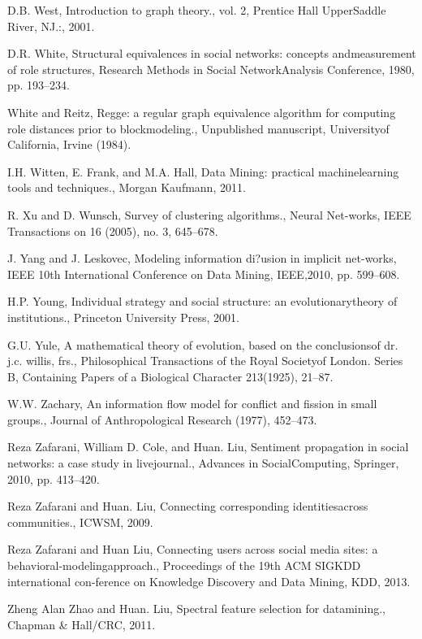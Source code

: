 \begin{thebibliography}{999}
 D.B. West, Introduction to graph theory., vol. 2, Prentice Hall UpperSaddle River, NJ.:, 2001.

 D.R. White, Structural equivalences in social networks: concepts andmeasurement of role structures, Research Methods in Social NetworkAnalysis Conference, 1980, pp. 193–234.

 White and Reitz, Regge: a regular graph equivalence algorithm for computing role distances prior to blockmodeling., Unpublished manuscript, Universityof California, Irvine (1984).

 I.H. Witten, E. Frank, and M.A. Hall, Data Mining: practical machinelearning tools and techniques., Morgan Kaufmann, 2011.

 R. Xu and D. Wunsch, Survey of clustering algorithms., Neural Net-works, IEEE Transactions on 16 (2005), no. 3, 645–678.

 J. Yang and J. Leskovec, Modeling information di?usion in implicit net-works, IEEE 10th International Conference on Data Mining, IEEE,2010, pp. 599–608.

 H.P. Young, Individual strategy and social structure: an evolutionarytheory of institutions., Princeton University Press, 2001.

 G.U. Yule, A mathematical theory of evolution, based on the conclusionsof dr. j.c. willis, frs., Philosophical Transactions of the Royal Societyof London. Series B, Containing Papers of a Biological Character 213(1925), 21–87.

 W.W. Zachary, An information flow model for conflict and fission in small groups., Journal of Anthropological Research (1977), 452–473.

 Reza Zafarani, William D. Cole, and Huan. Liu, Sentiment propagation in social networks: a case study in livejournal., Advances in SocialComputing, Springer, 2010, pp. 413–420.

 Reza Zafarani and Huan. Liu, Connecting corresponding identitiesacross communities., ICWSM, 2009.

 Reza Zafarani and Huan Liu, Connecting users across social media sites: a behavioral-modelingapproach., Proceedings of the 19th ACM SIGKDD international con-ference on Knowledge Discovery and Data Mining, KDD, 2013.

 Zheng Alan Zhao and Huan. Liu, Spectral feature selection for datamining., Chapman \& Hall/CRC, 2011.

\end{thebibliography}
